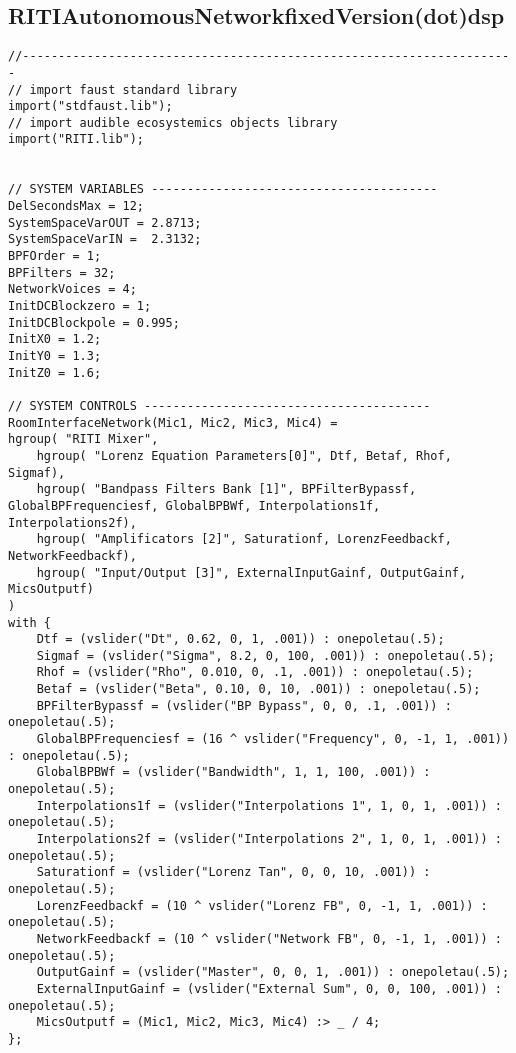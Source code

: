 \subsection{RITIAutonomousNetworkfixedVersion(dot)dsp}

\vspace{0.5cm}
\begin{lstlisting}
//---------------------------------------------------------------------
// import faust standard library
import("stdfaust.lib");
// import audible ecosystemics objects library
import("RITI.lib");


// SYSTEM VARIABLES ----------------------------------------
DelSecondsMax = 12;
SystemSpaceVarOUT = 2.8713;
SystemSpaceVarIN =  2.3132;
BPFOrder = 1;
BPFilters = 32;
NetworkVoices = 4;
InitDCBlockzero = 1;
InitDCBlockpole = 0.995;
InitX0 = 1.2;
InitY0 = 1.3;
InitZ0 = 1.6;

// SYSTEM CONTROLS ----------------------------------------
RoomInterfaceNetwork(Mic1, Mic2, Mic3, Mic4) = 
hgroup( "RITI Mixer", 
    hgroup( "Lorenz Equation Parameters[0]", Dtf, Betaf, Rhof, Sigmaf), 
    hgroup( "Bandpass Filters Bank [1]", BPFilterBypassf, GlobalBPFrequenciesf, GlobalBPBWf, Interpolations1f, Interpolations2f), 
    hgroup( "Amplificators [2]", Saturationf, LorenzFeedbackf, NetworkFeedbackf),
    hgroup( "Input/Output [3]", ExternalInputGainf, OutputGainf, MicsOutputf)
)
with {
    Dtf = (vslider("Dt", 0.62, 0, 1, .001)) : onepoletau(.5);
    Sigmaf = (vslider("Sigma", 8.2, 0, 100, .001)) : onepoletau(.5);
    Rhof = (vslider("Rho", 0.010, 0, .1, .001)) : onepoletau(.5);
    Betaf = (vslider("Beta", 0.10, 0, 10, .001)) : onepoletau(.5);
    BPFilterBypassf = (vslider("BP Bypass", 0, 0, .1, .001)) : onepoletau(.5);
    GlobalBPFrequenciesf = (16 ^ vslider("Frequency", 0, -1, 1, .001)) : onepoletau(.5);
    GlobalBPBWf = (vslider("Bandwidth", 1, 1, 100, .001)) : onepoletau(.5);
    Interpolations1f = (vslider("Interpolations 1", 1, 0, 1, .001)) : onepoletau(.5);
    Interpolations2f = (vslider("Interpolations 2", 1, 0, 1, .001)) : onepoletau(.5);
    Saturationf = (vslider("Lorenz Tan", 0, 0, 10, .001)) : onepoletau(.5);
    LorenzFeedbackf = (10 ^ vslider("Lorenz FB", 0, -1, 1, .001)) : onepoletau(.5); 
    NetworkFeedbackf = (10 ^ vslider("Network FB", 0, -1, 1, .001)) : onepoletau(.5); 
    OutputGainf = (vslider("Master", 0, 0, 1, .001)) : onepoletau(.5);
    ExternalInputGainf = (vslider("External Sum", 0, 0, 100, .001)) : onepoletau(.5);
    MicsOutputf = (Mic1, Mic2, Mic3, Mic4) :> _ / 4;
};


\end{lstlisting}
